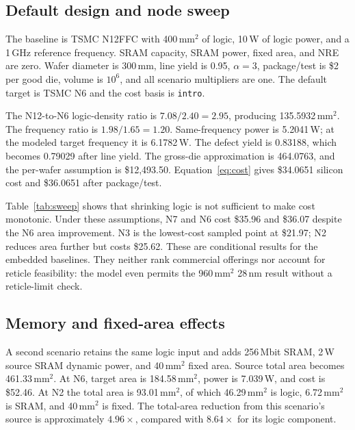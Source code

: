\documentclass[11pt,a4paper]{article}
\begin{document}
\subsection{Default design and node sweep}
The baseline is TSMC N12FFC with 400\,mm$^2$ of logic, 10\,W of logic power,
and a 1\,GHz reference frequency. SRAM capacity, SRAM power, fixed area, and
NRE are zero. Wafer diameter is 300\,mm, line yield is 0.95,
$\alpha=3$, package/test is \$2 per good die, volume is $10^6$, and all
scenario multipliers are one. The default target is TSMC N6 and the cost
basis is \texttt{intro}.

The N12-to-N6 logic-density ratio is $7.08/2.40=2.95$, producing
135.5932\,mm$^2$. The frequency ratio is $1.98/1.65=1.20$. Same-frequency
power is 5.2041\,W; at the modeled target frequency it is 6.1782\,W.
The defect yield is 0.83188, which becomes 0.79029 after line yield.
The gross-die approximation is 464.0763, and the per-wafer assumption is
\$12,493.50. Equation~\ref{eq:cost} gives \$34.0651 silicon cost and
\$36.0651 after package/test.

\begin{table}[htbp]
\centering\small
\caption{TSMC sweep for the fixed N12 reference design. Every value is an
output of the repository model under the default introductory-price basis.
Power is evaluated at the estimated target frequency.}
\label{tab:sweep}

\end{table}

Table~\ref{tab:sweep} shows that shrinking logic is not sufficient to make
cost monotonic. Under these assumptions, N7 and N6 cost \$35.96 and
\$36.07 despite the N6 area improvement. N3 is the lowest-cost sampled point
at \$21.97; N2 reduces area further but costs \$25.62. These are conditional
results for the embedded baselines. They neither rank commercial offerings
nor account for reticle feasibility: the model even permits the 960\,mm$^2$
28\,nm result without a reticle-limit check.

\subsection{Memory and fixed-area effects}
A second scenario retains the same logic input and adds 256\,Mbit SRAM,
2\,W source SRAM dynamic power, and 40\,mm$^2$ fixed area. Source total area
becomes 461.33\,mm$^2$. At N6, target area is 184.58\,mm$^2$,
power is 7.039\,W, and cost is \$52.46. At N2 the total area is
93.01\,mm$^2$, of which 46.29\,mm$^2$ is logic, 6.72\,mm$^2$ is SRAM,
and 40\,mm$^2$ is fixed. The total-area reduction from this scenario's
source is approximately $4.96\times$, compared with $8.64\times$ for its
logic component.
\end{document}
